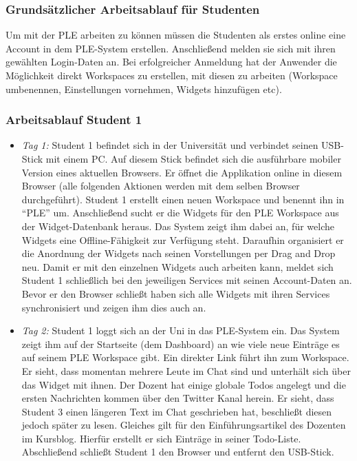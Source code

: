 \subsubsection*{Grundsätzlicher Arbeitsablauf für Studenten}
Um mit der PLE arbeiten zu können müssen die Studenten als erstes online eine Account in dem PLE-System erstellen. Anschließend melden sie sich mit ihren gewählten Login-Daten an. Bei erfolgreicher Anmeldung hat der Anwender die Möglichkeit direkt Workspaces zu erstellen, mit diesen zu arbeiten (Workspace umbenennen, Einstellungen vornehmen, Widgets hinzufügen etc).

\subsubsection*{Arbeitsablauf Student 1}
\begin{itemize}
 \item \emph{Tag 1:} Student 1 befindet sich in der Universität und verbindet seinen USB-Stick mit einem PC. Auf diesem Stick befindet sich die ausführbare mobiler Version eines aktuellen Browsers. Er öffnet die Applikation online in diesem Browser (alle folgenden Aktionen werden mit dem selben Browser durchgeführt). Student 1 erstellt einen neuen Workspace und benennt ihn in "`PLE"' um. Anschließend sucht er die Widgets für den PLE Workspace aus der Widget-Datenbank heraus. Das System zeigt ihm dabei an, für welche Widgets eine Offline-Fähigkeit zur Verfügung steht. Daraufhin organisiert er die Anordnung der Widgets nach seinen Vorstellungen per Drag and Drop neu. Damit er mit den einzelnen Widgets auch arbeiten kann, meldet sich Student 1 schließlich bei den jeweiligen Services mit seinen Account-Daten an. Bevor er den Browser schließt haben sich alle Widgets mit ihren Services synchronisiert und zeigen ihm dies auch an.
 \item \emph{Tag 2:} Student 1 loggt sich an der Uni in das PLE-System ein. Das System zeigt ihm auf der Startseite (dem Dashboard) an wie viele neue Einträge es auf seinem PLE Workspace gibt. Ein direkter Link führt ihn zum Workspace. Er sieht, dass momentan mehrere Leute im Chat sind und unterhält sich über das Widget mit ihnen. Der Dozent hat einige globale Todos angelegt und die ersten Nachrichten kommen über den Twitter Kanal herein. Er sieht, dass Student 3 einen längeren Text im Chat geschrieben hat, beschließt diesen jedoch später zu lesen. Gleiches gilt für den Einführungsartikel des Dozenten im Kursblog. Hierfür erstellt er sich Einträge in seiner Todo-Liste. Abschließend schließt Student 1 den Browser und entfernt den USB-Stick.

\end{itemize}
